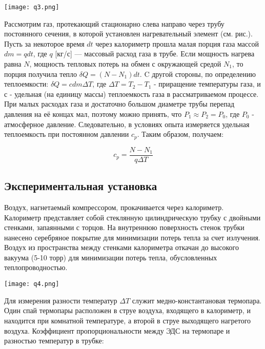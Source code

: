 \documentclass[a4paper,17pt]{article}
\begin{document}
    \begin{center}
        \texttt{[image: q3.png]}\\    
    \end{center}
    
    Рассмотрим газ, протекающий стационарно слева направо через трубу постоянного сечения, в которой установлен нагревательный элемент (см. рис.). Пусть за некоторое время $d t$ через калориметр прошла малая порция газа массой $d m = q d t$, где $q$ [кг/с] — массовый расход газа в трубе. Если мощность нагрева равна  $N$, мощность тепловых потерь на обмен с окружающей средой $N_1$, то порция получила тепло $\delta Q = (N - N_1)d t$. C другой стороны, по определению теплоемкости: $\delta Q = c d m \Delta T$, где $\Delta T = T_2 - T_1$ - приращение температуры газа, и $с$ - удельная (на единицу массы) теплоемкость газа в рассматриваемом процессе. При малых расходах газа и достаточно большом диаметре трубы перепад давления на её концах мал, поэтому можно принять, что $P_1 \approx P_2 = P_0$, где $P_0$ - атмосферное давление. Следовательно, в условиях опыта измеряется удельная теплоемкость при постоянном давлении $c_p$. Таким образом, получаем:
    
    \begin{equation}
        c_p = \frac{N - N_1}{q \Delta T}\label{answer}
    \end{equation}

\subsection{Экспериментальная установка}
    Воздух, нагнетаемый компрессором, прокачивается через калориметр. Калориметр представляет собой стеклянную цилиндрическую трубку с двойными стенками, запаянными с торцов. На внутреннюю поверхность стенок трубки нанесено серебряное покрытие для минимизации потерь тепла за счет излучения. Воздух из пространства между стенками калориметра откачан до высокого вакуума (5-10 торр) для минимизации потерь тепла, обусловленных теплопроводностью.
    
    \begin{center}
        \texttt{[image: q4.png]}   
    \end{center}
    
    Для измерения разности температур $\Delta T$ служит медно-константановая термопара. Один спай термопары расположен в струе воздуха, входящего в калориметр, и находится при комнатной температуре, а второй в струе выходящего нагретого воздуха.
    Коэффициент пропорциональности между ЭДС на термопаре и разностью температур в трубке:
    
\end{document}
